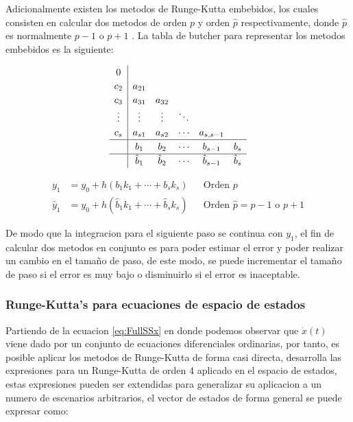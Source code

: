         Adicionalmente existen los metodos de Runge-Kutta embebidos, los cuales consisten en calcular dos metodos de orden $p$ y orden $\hat{p}$ respectivamente, donde $\hat{p}$ es normalmente $p-1$ o $p+1$ \Parencite{hairer1991solving}. La tabla de butcher para representar los metodos embebidos es la siguiente:

        \begin{equation}\label{eq:embebidoButcher}
            \renewcommand\arraystretch{1.2}
            \begin{array}
            {c|ccccc}
            0\\
            c_2 & a_{21}\\
            c_3 & a_{31} & a_{32}\\
            \vdots & \vdots & \vdots & \ddots\\
            c_s & a_{s1} & a_{s2} & \cdots & a_{s,s-1}\\
            \hline
            & b_1 & b_2 & \cdots & b_{s-1} &  b_{s}\\
            \hline
            & \hat{b}_1 & \hat{b}_2 & \cdots & \hat{b}_{s-1} &  \hat{b}_{s}
            \end{array}
        \end{equation}

        \begin{align}
            y_1 &= y_0 + h(b_1 k_1 + \cdots + b_s k_s) & &\text{Orden $p$}\\
            \hat{y}_1 &= y_0 + h(\hat{b}_1 k_1 + \cdots +\hat{b}_s k_s) & &\text{Orden $\hat{p} = p-1$ o $p+1$}
        \end{align}

        De modo que la integracion para el siguiente paso se continua con $y_1$, el fin de calcular dos metodos en conjunto es para poder estimar el error y poder realizar un cambio en el tamaño de paso, de este modo, se puede incrementar el tamaño de paso si el error es muy bajo o disminuirlo si el error es inaceptable.
        
        \subsubsection{Runge-Kutta's para ecuaciones de espacio de estados}

            Partiendo de la ecuacion \cref{eq:FullSSx} en donde podemos observar que $\dot{x}(t)$ viene dado por un conjunto de ecuaciones diferenciales ordinarias, por tanto, es posible aplicar los metodos de Runge-Kutta de forma casi directa, \textcite{horacio1997metodos} desarrolla las expresiones para un Runge-Kutta de orden 4 aplicado en el espacio de estados, estas expresiones pueden ser extendidas para generalizar su aplicacion a un numero de escenarios arbitrarios, el vector de estados de forma general se puede expresar como:

